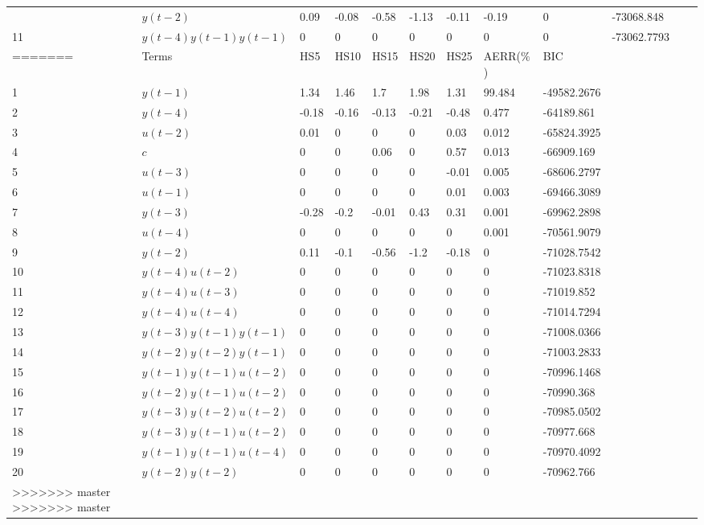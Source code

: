 \begin{tabular}{llllllllllll}
\begin{tabular}{llllllllll}
10 & $y(t-2)$ & 0.09 & -0.08 & -0.58 & -1.13 & -0.11 & -0.19 & 0 & -73068.848 \\ 
11 & $y(t-4)y(t-1)y(t-1)$ & 0 & 0 & 0 & 0 & 0 & 0 & 0 & -73062.7793 \\ 
=======
\begin{tabular}{lllllllll}
Step & Terms & HS5 & HS10 & HS15 & HS20 & HS25 & AERR($\%$) & BIC \\ 
\hline 
1 & $y(t-1)$ & 1.34 & 1.46 & 1.7 & 1.98 & 1.31 & 99.484 & -49582.2676 \\ 
2 & $y(t-4)$ & -0.18 & -0.16 & -0.13 & -0.21 & -0.48 & 0.477 & -64189.861 \\ 
3 & $u(t-2)$ & 0.01 & 0 & 0 & 0 & 0.03 & 0.012 & -65824.3925 \\ 
4 & $c$ & 0 & 0 & 0.06 & 0 & 0.57 & 0.013 & -66909.169 \\ 
5 & $u(t-3)$ & 0 & 0 & 0 & 0 & -0.01 & 0.005 & -68606.2797 \\ 
6 & $u(t-1)$ & 0 & 0 & 0 & 0 & 0.01 & 0.003 & -69466.3089 \\ 
7 & $y(t-3)$ & -0.28 & -0.2 & -0.01 & 0.43 & 0.31 & 0.001 & -69962.2898 \\ 
8 & $u(t-4)$ & 0 & 0 & 0 & 0 & 0 & 0.001 & -70561.9079 \\ 
9 & $y(t-2)$ & 0.11 & -0.1 & -0.56 & -1.2 & -0.18 & 0 & -71028.7542 \\ 
10 & $y(t-4)u(t-2)$ & 0 & 0 & 0 & 0 & 0 & 0 & -71023.8318 \\ 
11 & $y(t-4)u(t-3)$ & 0 & 0 & 0 & 0 & 0 & 0 & -71019.852 \\ 
12 & $y(t-4)u(t-4)$ & 0 & 0 & 0 & 0 & 0 & 0 & -71014.7294 \\ 
13 & $y(t-3)y(t-1)y(t-1)$ & 0 & 0 & 0 & 0 & 0 & 0 & -71008.0366 \\ 
14 & $y(t-2)y(t-2)y(t-1)$ & 0 & 0 & 0 & 0 & 0 & 0 & -71003.2833 \\ 
15 & $y(t-1)y(t-1)u(t-2)$ & 0 & 0 & 0 & 0 & 0 & 0 & -70996.1468 \\ 
16 & $y(t-2)y(t-1)u(t-2)$ & 0 & 0 & 0 & 0 & 0 & 0 & -70990.368 \\ 
17 & $y(t-3)y(t-2)u(t-2)$ & 0 & 0 & 0 & 0 & 0 & 0 & -70985.0502 \\ 
18 & $y(t-3)y(t-1)u(t-2)$ & 0 & 0 & 0 & 0 & 0 & 0 & -70977.668 \\ 
19 & $y(t-1)y(t-1)u(t-4)$ & 0 & 0 & 0 & 0 & 0 & 0 & -70970.4092 \\ 
20 & $y(t-2)y(t-2)$ & 0 & 0 & 0 & 0 & 0 & 0 & -70962.766 \\ 
>>>>>>> master
>>>>>>> master
\hline 
\end{tabular}